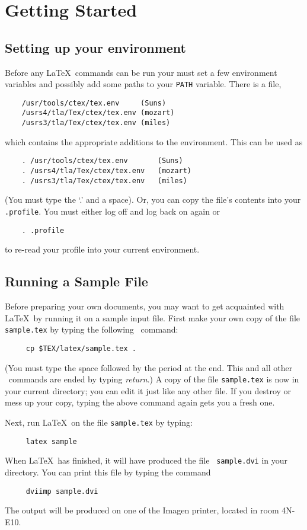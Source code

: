 \section{Getting Started}

\subsection{Setting up your environment}

Before any \LaTeX\ commands can be run your must set a few environment
variables and possibly add some paths to your \verb|PATH| variable.
There is a file, 
\begin{verbatim}
	/usr/tools/ctex/tex.env		(Suns)
	/usrs4/tla/Tex/ctex/tex.env	(mozart)
	/usrs3/tla/Tex/ctex/tex.env	(miles)
\end{verbatim}
which contains the appropriate additions to the environment.  This can
be used as 
\begin{verbatim}
	. /usr/tools/ctex/tex.env       (Suns)
	. /usrs4/tla/Tex/ctex/tex.env   (mozart)
	. /usrs3/tla/Tex/ctex/tex.env   (miles)
\end{verbatim}
(You must type the `.' and a space).  Or, you can copy the file's
contents into your \verb|.profile|.  You must either log off and log
back on again or 
\begin{verbatim}
	. .profile
\end{verbatim}
to re-read your profile into your current environment.

\subsection{Running a Sample File} \label{sec:sample}

Before preparing your own documents, you may want to get acquainted
with \LaTeX\ by running it on a sample input file.  First make your own
copy of the file \mbox{\tt sample.tex} by typing the following
\UNIX\ command:
\begin{verbatim}
     cp $TEX/latex/sample.tex .
\end{verbatim}
(You must type the space followed by the period at the end.  This
and all other \UNIX\ commands are ended by typing {\em return}.)
A copy of the file \mbox{\tt sample.tex} is now in your current
directory; you can edit it just like any other file.  If you destroy or
mess up your copy, typing the above command again gets you a fresh
one.

Next, run \LaTeX\ on the file \mbox{\tt sample.tex} by typing:
\begin{verbatim}
     latex sample
\end{verbatim}
When \LaTeX\ has finished, it will have produced the file \mbox{\tt
sample.dvi} in your directory.  You can print this file by typing the
command
\begin{verbatim}
     dviimp sample.dvi
\end{verbatim}
The output will be produced on one of the Imagen printer, located in
room 4N-E10.

